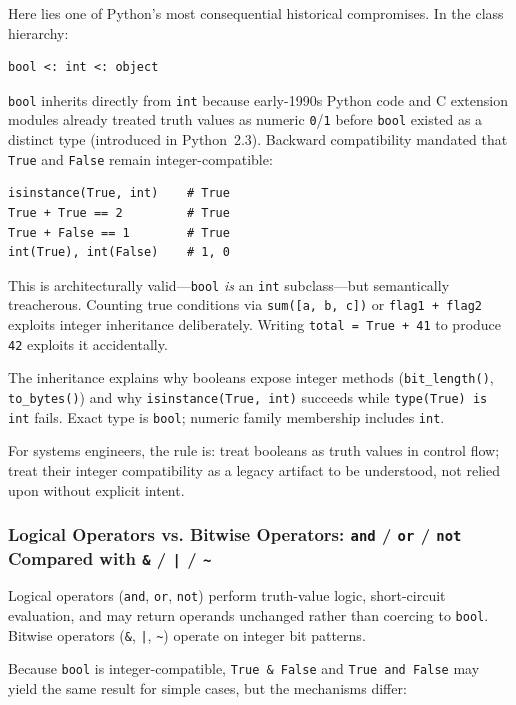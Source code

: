 \documentclass[a4paper,twoside]{report}
\begin{document}
Here lies one of Python's most consequential historical compromises. In the class hierarchy:

\begin{verbatim}
bool <: int <: object
\end{verbatim}

\texttt{bool} inherits directly from \texttt{int} because early-1990s Python code and C extension modules already treated truth values as numeric \texttt{0}/\texttt{1} before \texttt{bool} existed as a distinct type (introduced in Python~2.3). Backward compatibility mandated that \texttt{True} and \texttt{False} remain integer-compatible:

\begin{verbatim}
isinstance(True, int)    # True
True + True == 2         # True
True + False == 1        # True
int(True), int(False)    # 1, 0
\end{verbatim}

This is architecturally valid---\texttt{bool} \emph{is} an \texttt{int} subclass---but semantically treacherous. Counting true conditions via \texttt{sum([a, b, c])} or \texttt{flag1 + flag2} exploits integer inheritance deliberately. Writing \texttt{total = True + 41} to produce \texttt{42} exploits it accidentally.

The inheritance explains why booleans expose integer methods (\texttt{bit\_length()}, \texttt{to\_bytes()}) and why \texttt{isinstance(True, int)} succeeds while \texttt{type(True) is int} fails. Exact type is \texttt{bool}; numeric family membership includes \texttt{int}.

For systems engineers, the rule is: treat booleans as truth values in control flow; treat their integer compatibility as a legacy artifact to be understood, not relied upon without explicit intent.

\subsubsection{Logical Operators vs. Bitwise Operators: \texttt{and} / \texttt{or} / \texttt{not} Compared with \texttt{\&} / \texttt{|} / \texttt{\textasciitilde{}}}

Logical operators (\texttt{and}, \texttt{or}, \texttt{not}) perform truth-value logic, short-circuit evaluation, and may return operands unchanged rather than coercing to \texttt{bool}. Bitwise operators (\texttt{\&}, \texttt{|}, \texttt{\textasciitilde{}}) operate on integer bit patterns.

Because \texttt{bool} is integer-compatible, \texttt{True \& False} and \texttt{True and False} may yield the same result for simple cases, but the mechanisms differ:
\end{document}
